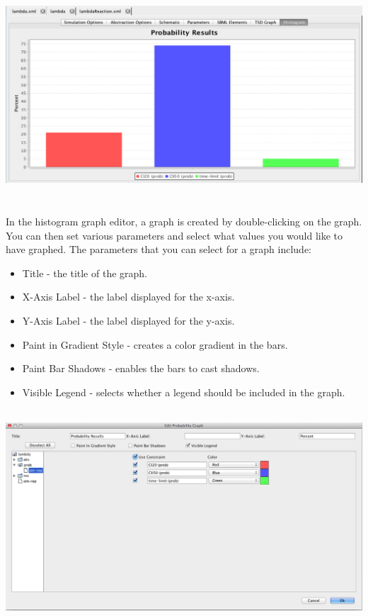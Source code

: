\documentclass[titlepage,11pt]{article}
\begin{document}
\begin{center} 
\includegraphics[height=80mm]{screenshots/probResults}
\end{center}

In the histogram graph editor, a graph is created by double-clicking on the graph. You can then set various parameters and select what values you would like to have graphed. The parameters that you can select for a graph include: 
\begin{itemize}
\item Title - the title of the graph.
\item X-Axis Label - the label displayed for the x-axis. 
\item Y-Axis Label - the label displayed for the y-axis. 
\item Paint in Gradient Style - creates a color gradient in the bars.
\item Paint Bar Shadows - enables the bars to cast shadows.
\item Visible Legend - selects whether a legend should be included in the graph.
\end{itemize}

\begin{center}
\includegraphics[height=80mm]{screenshots/editProbGraph}
\end{center}
\end{document}
